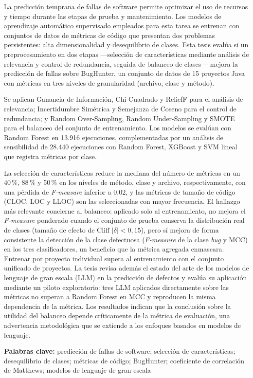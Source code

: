 \fontsize{12pt}{13}\selectfont %

La predicción temprana de fallas de software permite optimizar el uso de recursos y tiempo durante las etapas de prueba y mantenimiento. Los modelos de aprendizaje automático supervisado empleados para esta tarea se entrenan con conjuntos de datos de métricas de código que presentan dos problemas persistentes: alta dimensionalidad y desequilibrio de clases. Esta tesis evalúa si un preprocesamiento en dos etapas ---selección de características mediante análisis de relevancia y control de redundancia, seguida de balanceo de clases--- mejora la predicción de fallas sobre BugHunter, un conjunto de datos de 15 proyectos Java con métricas en tres niveles de granularidad (archivo, clase y método).

Se aplican Ganancia de Información, Chi-Cuadrado y ReliefF para el análisis de relevancia; Incertidumbre Simétrica y Semejanza de Coseno para el control de redundancia; y Random Over-Sampling, Random Under-Sampling y SMOTE para el balanceo del conjunto de entrenamiento. Los modelos se evalúan con Random Forest en 13.916 ejecuciones, complementadas por un análisis de sensibilidad de 28.440 ejecuciones con Random Forest, XGBoost y SVM lineal que registra métricas por clase.

La selección de características reduce la mediana del número de métricas en un 40\,\%, 88\,\% y 50\,\% en los niveles de método, clase y archivo, respectivamente, con una pérdida de \textit{F-measure} inferior a 0,02, y las métricas de tamaño de código (CLOC, LOC y LLOC) son las seleccionadas con mayor frecuencia. El hallazgo más relevante concierne al balanceo: aplicado solo al entrenamiento, no mejora el \textit{F-measure} ponderado cuando el conjunto de prueba conserva la distribución real de clases (tamaño de efecto de Cliff $|\delta| < 0{,}15$), pero sí mejora de forma consistente la detección de la clase defectuosa (\textit{F-measure} de la clase \textit{bug} y MCC) en los tres clasificadores, un beneficio que la métrica agregada enmascara. Entrenar por proyecto individual supera al entrenamiento con el conjunto unificado de proyectos. La tesis revisa además el estado del arte de los modelos de lenguaje de gran escala (LLM) en la predicción de defectos y evalúa su aplicación mediante un piloto exploratorio: tres LLM aplicados directamente sobre las métricas no superan a Random Forest en MCC y reproducen la misma dependencia de la métrica. Los resultados indican que la conclusión sobre la utilidad del balanceo depende críticamente de la métrica de evaluación, una advertencia metodológica que se extiende a los enfoques basados en modelos de lenguaje.

\hfill \break
\textbf{Palabras clave:} predicción de fallas de software; selección de características; desequilibrio de clases; métricas de código; BugHunter; coeficiente de correlación de Matthews; modelos de lenguaje de gran escala
